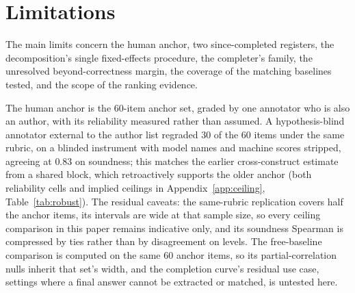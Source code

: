 \section{Limitations}
\label{sec:limits}

The main limits concern the human anchor, two since-completed registers, the decomposition's single fixed-effects procedure, the completer's family, the unresolved beyond-correctness margin, the coverage of the matching baselines tested, and the scope of the ranking evidence.

The human anchor is the 60-item anchor set, graded by one annotator who is also an author, with its reliability measured rather than assumed.
A hypothesis-blind annotator external to the author list regraded 30 of the 60 items under the same rubric, on a blinded instrument with model names and machine scores stripped, agreeing at $0.83$ on soundness; this matches the earlier cross-construct estimate from a shared block, which retroactively supports the older anchor (both reliability cells and implied ceilings in Appendix~\ref{app:ceiling}, Table~\ref{tab:robust}).
The residual caveats: the same-rubric replication covers half the anchor items, its intervals are wide at that sample size, so every ceiling comparison in this paper remains indicative only, and its soundness Spearman is compressed by ties rather than by disagreement on levels.
The free-baseline comparison is computed on the same 60 anchor items, so its partial-correlation nulls inherit that set's width, and the completion curve's residual use case, settings where a final answer cannot be extracted or matched, is untested here.

